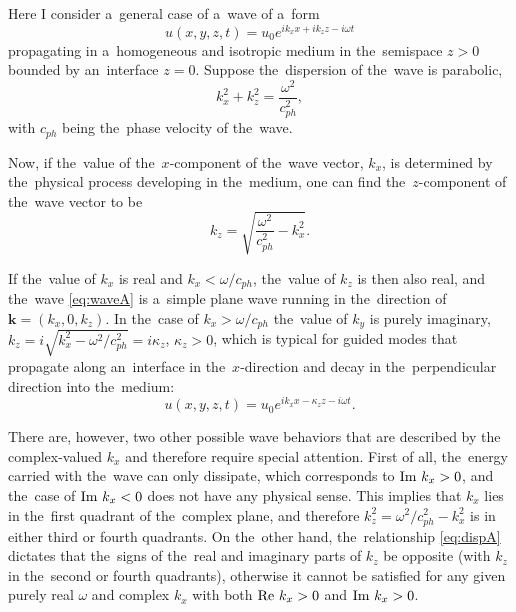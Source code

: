 \renewcommand{\theHchapter}{A\arabic{chapter}}

Here I consider a~general case of a~wave of a~form
\begin{equation}
\label{eq:waveA}
u(x,y,z,t) = u_0 e^{ik_xx+ik_zz-i\omega t}
\end{equation}
propagating in a~homogeneous and isotropic medium in the~semispace $z>0$ bounded by an~interface $z=0$.
Suppose the~dispersion of the~wave is parabolic,
\begin{equation}
\label{eq:dispA}
k_x^2+k_z^2 = \frac{\omega^2}{c_{ph}^2},
\end{equation}
with $c_{ph}$ being the~phase velocity of the~wave.

Now, if the~value of the~$x$-component of the~wave vector, $k_x$, is determined by the~physical process developing in the~medium, one can find the~$z$-component of the~wave vector to be
\begin{equation}
\label{eq:dispkzA}
k_z = \sqrt{\frac{\omega^2}{c_{ph}^2}-k_x^2}.
\end{equation}

If the~value of $k_x$ is real and $k_x < \omega/c_{ph}$, the~value of $k_z$ is then also real, and the~wave \cref{eq:waveA} is a~simple plane wave running in the~direction of $\textbf{k} = (k_x,0,k_z)$.
In the~case of $k_x > \omega/c_{ph}$ the~value of $k_y$ is purely imaginary, $k_z = i\sqrt{k_x^2-\omega^2/c_{ph}^2} = i\kappa_z$, $\kappa_z>0$, which is typical for guided modes that propagate along an~interface in the~$x$-direction and decay in the~perpendicular direction into the~medium:
\begin{equation*}
u(x,y,z,t) = u_0 e^{ik_xx-\kappa_zz-i\omega t}.
\end{equation*}

There are, however, two other possible wave behaviors that are described by the complex-valued $k_x$ and therefore require special attention.
First of all, the~energy carried with the~wave can only dissipate, which corresponds to $\textrm{Im } k_x > 0$, and the~case of $\textrm{Im } k_x < 0$ does not have any physical sense.
This implies that $k_x$ lies in the~first quadrant of the~complex plane, and therefore $k_z^2 = \omega^2/c_{ph}^2-k_x^2$ is in either third or fourth quadrants.
On the~other hand, the~relationship \cref{eq:dispA} dictates that the~signs of the~real and imaginary parts of $k_z$ be opposite (with $k_z$ in the~second or fourth quadrants), otherwise it cannot be satisfied for any given purely real $\omega$ and complex $k_x$ with both $\textrm{Re } k_x > 0$ and $\textrm{Im } k_x > 0$.

